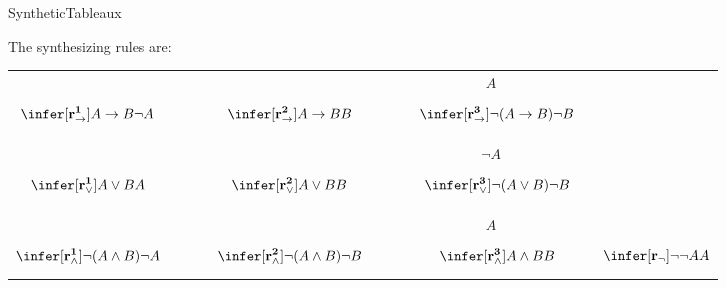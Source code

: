 
\calculusAcronym{}     



\maketitle



\begin{entry}{SyntheticTableaux}

\begin{calculus}

The synthesizing rules are:

\begin{center}
\begin{tabular}{ccccccc}
&&&&$A~~~~$&&  \\

$$
\infer[\mathbf{r^1_{\rightarrow}}]{A \rightarrow B}{\lnot A}
$$
&~~~~&
$$
\infer[\mathbf{r^2_{\rightarrow}}]{A \rightarrow B}{B}
$$
&~~~~&
$$
\infer[\mathbf{r^3_{\rightarrow}}]{\lnot (A \rightarrow B)}{\lnot B}
$$

&&\\
&&&&&&\\

&&&&$\lnot A~~~~$&& \\

$$
\infer[\mathbf{r^1_{\lor}}]{A \lor B}{A}
$$
&&
$$
\infer[\mathbf{r^2_{\lor}}]{A \lor B}{B}
$$
&&
$$
\infer[\mathbf{r^3_{\lor}}]{\lnot (A \lor B)}{\lnot B}
$$

&&\\
&&&&&&\\

&&&&$A~~~~$&& \\

$$
\infer[\mathbf{r^1_{\land}}]{\lnot (A \land B)}{\lnot A}
$$
&&
$$
\infer[\mathbf{r^2_{\land}}]{\lnot (A \land B)}{\lnot B}
$$
&&
$$
\infer[\mathbf{r^3_{\land}}]{A \land B}{B}
$$

&&

$$
\infer[\mathbf{r_{\neg}}]{\lnot \lnot A}{A}
$$
\\

\end{tabular}
\end{center}


\end{calculus}
\end{entry}
